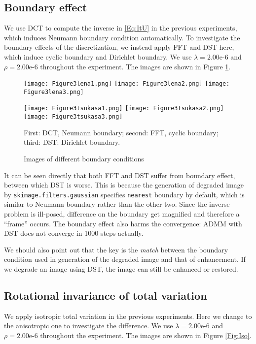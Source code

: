 \documentclass[english, nochinese]{pnote}
\begin{document}
\subsection{Boundary effect}

We use DCT to compute the inverse in \eqref{Eq:ItU} in the previous experiments, which induces Neumann boundary condition automatically. To investigate the boundary effects of the discretization, we instead apply FFT and DST here, which induce cyclic boundary and Dirichlet boundary. We use $ \lambda = \text{2.00e-6} $ and $ \rho = \text{2.00e-6} $ throughout the experiment. The images are shown in Figure \ref{Fig:Bound}.

\begin{figure}[htb]
{
\centering

\texttt{[image: Figure3lena1.png]}
\texttt{[image: Figure3lena2.png]}
\texttt{[image: Figure3lena3.png]}

\texttt{[image: Figure3tsukasa1.png]}
\texttt{[image: Figure3tsukasa2.png]}
\texttt{[image: Figure3tsukasa3.png]}

\caption{Images of different boundary conditions}
\label{Fig:Bound}
}
{
\footnotesize First: DCT, Neumann boundary; second: FFT, cyclic boundary; third: DST: Dirichlet boundary.
}
\end{figure}

It can be seen directly that both FFT and DST suffer from boundary effect, between which DST is worse. This is because the generation of degraded image by \verb"skimage.filters.gaussian" specifies \verb"nearest" boundary by default, which is similar to Neumann boundary rather than the other two. Since the inverse problem is ill-posed, difference on the boundary get magnified and therefore a ``frame'' occurs. The boundary effect also harms the convergence: ADMM with DST does not converge in 1000 steps actually.

We should also point out that the key is the \emph{match} between the boundary condition used in generation of the degraded image and that of enhancement. If we degrade an image using DST, the image can still be enhanced or restored.

\subsection{Rotational invariance of total variation}

We apply isotropic total variation in the previous experiments. Here we change to the anisotropic one to investigate the difference. We use $ \lambda = \text{2.00e-6} $ and $ \rho = \text{2.00e-6} $ throughout the experiment. The images are shown in Figure \ref{Fig:Iso}.
\end{document}
